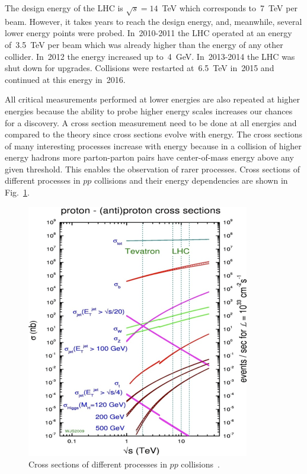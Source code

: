 


The design energy of the LHC is $\sqrt{s}=14$~TeV which corresponds to~7~TeV per beam. However, it takes years to reach the design energy, and, meanwhile, several lower energy points were probed. In~2010-2011 the LHC operated at an energy of~3.5~TeV per beam which was already higher than the energy of any other collider. In~2012 the energy increased up to~4~GeV. In~2013-2014 the LHC was shut down for upgrades. Collisions were restarted at~6.5~TeV in~2015 and continued at this energy in~2016. 

All critical measurements performed at lower energies are also repeated at higher energies because the ability to probe higher energy scales increases our chances for a discovery. A cross section measurement need to be done at all energies and compared to the theory since cross sections evolve with energy. The cross sections of many interesting processes increase with energy because in a collision of higher energy hadrons more parton-parton pairs have center-of-mass energy above any given threshold. This enables the observation of rarer processes. Cross sections of different processes in $pp$ collisions and their energy dependencies are shown in Fig.~\ref{fig:LHC_totalCS}.

\begin{figure}
  \centering
  \includegraphics[width=.65\linewidth]{../figs/Exp/LHC_totalCS.png}
  \caption{Cross sections of different processes in $pp$ collisions~\cite{ref_fig_LHC_totalCS}.}
  \label{fig:LHC_totalCS}
\end{figure}

